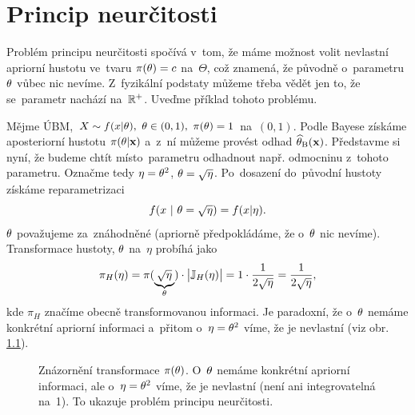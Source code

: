 \chapter{Princip neurčitosti}

Problém principu neurčitosti spočívá v~tom, že máme možnost volit nevlastní apriorní hustotu ve~tvaru $\pi(\theta)=c$ na~$\Theta$, což znamená, že původně o~parametru $\theta$ vůbec nic nevíme. Z~fyzikální podstaty můžeme třeba vědět jen to, že se~parametr nachází na~$\mathbb{R}^+$. Uveďme příklad tohoto problému.
\begin{example}
	Mějme ÚBM, $X\sim f(x|\theta),~\theta\in(0,1),~\pi(\theta)=1$ na~$(0,1)$. Podle Bayese získáme aposteriorní hustotu $\pi(\theta|\textbf{x})$ a~z~ní můžeme provést odhad $\widehat{\theta}_\mathrm{B}(\textbf{x})$. Představme si nyní, že budeme chtít místo~parametru odhadnout např. odmocninu z~tohoto parametru. Označme tedy $\eta=\theta^2$, $\theta=\sqrt{\eta}$. Po~dosazení do~původní hustoty získáme reparametrizaci $$f(x~|~\theta=\sqrt{\eta})=f(x|\eta).$$ $\theta$ považujeme za~znáhodněné (apriorně předpokládáme, že o~$\theta$ nic nevíme). Transformace hustoty, $\theta$ na~$\eta$ probíhá jako $$\pi_H(\eta)=\pi(\underbrace{\sqrt{\eta}}_{\theta})\cdot\big|\mathbb{J}_H(\eta)\big|=1\cdot\frac{1}{2\sqrt{\eta}}=\frac{1}{2\sqrt{\eta}},$$
	kde $\pi_H$ značíme obecně transformovanou informaci. Je paradoxní, že o~$\theta$ nemáme konkrétní apriorní informaci a~přitom o~$\eta=\theta^2$ víme, že je nevlastní (viz obr. \ref{fig:p71}).
	\begin{figure}[h]
		\centering
		\caption{Znázornění transformace $\pi(\theta)$. O~$\theta$ nemáme konkrétní apriorní informaci, ale o~$\eta=\theta^2$ víme, že je nevlastní (není ani integrovatelná na~1). To ukazuje problém principu neurčitosti.}
		\label{fig:p71}
	\end{figure}
	
\end{example}
